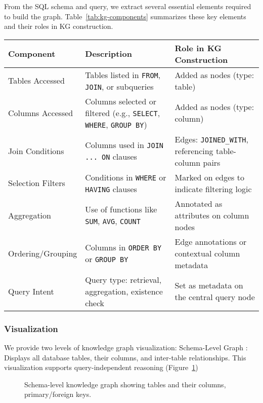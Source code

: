 \documentclass[11pt]{article}
\begin{document}
From the SQL schema and query, we extract several essential elements required to build the graph. Table~\ref{tab:kg-components} summarizes these key elements and their roles in KG construction.

\begin{table*}[h]
\centering

\begin{tabular}{|p{4cm}|p{5cm}|p{6cm}|}
\hline
\textbf{Component} & \textbf{Description} & \textbf{Role in KG Construction} \\
\hline
Tables Accessed & Tables listed in \texttt{FROM}, \texttt{JOIN}, or subqueries & Added as nodes (type: table) \\
\hline
Columns Accessed & Columns selected or filtered (e.g., \texttt{SELECT}, \texttt{WHERE}, \texttt{GROUP BY}) & Added as nodes (type: column) \\
\hline
Join Conditions & Columns used in \texttt{JOIN ... ON} clauses & Edges: \texttt{JOINED\_WITH}, referencing table-column pairs \\
\hline
Selection Filters & Conditions in \texttt{WHERE} or \texttt{HAVING} clauses & Marked on edges to indicate filtering logic \\
\hline
Aggregation & Use of functions like \texttt{SUM}, \texttt{AVG}, \texttt{COUNT} & Annotated as attributes on column nodes \\
\hline
Ordering/Grouping & Columns in \texttt{ORDER BY} or \texttt{GROUP BY} & Edge annotations or contextual column metadata \\
\hline
Query Intent & Query type: retrieval, aggregation, existence check & Set as metadata on the central query node \\
\hline

\end{tabular}
\caption{Key SQL Query Components Used for Knowledge Graph Construction}
\label{tab:kg-components}
\end{table*}



\subsubsection{Visualization}
We provide two levels of knowledge graph visualization:
Schema-Level Graph : Displays all database tables, their columns, and inter-table relationships. This visualization supports query-independent reasoning (Figure~\ref{fig:schema-graph})

\begin{figure}[h]
\centering
\setlength\fboxrule{1pt}  %
\setlength\fboxsep{0pt}   %
\caption{Schema-level knowledge graph showing tables and their columns, primary/foreign keys.}
\label{fig:schema-graph}
\end{figure}
\end{document}
